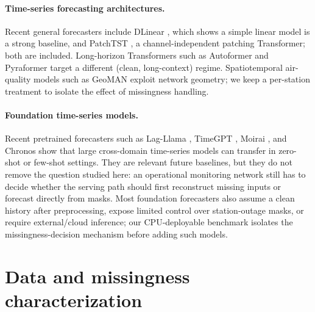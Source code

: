 \documentclass[review,3p,times]{elsarticle}
\begin{document}
\paragraph{Time-series forecasting architectures.}
Recent general forecasters include DLinear \citep{zeng2023dlinear}, which shows a
simple linear model is a strong baseline, and PatchTST \citep{nie2023patchtst},
a channel-independent patching Transformer; both are included. Long-horizon
Transformers such as Autoformer \citep{wu2021autoformer} and Pyraformer
\citep{liu2022pyraformer} target a different (clean, long-context) regime.
Spatiotemporal air-quality models such as GeoMAN \citep{liang2018geoman} exploit
network geometry; we keep a per-station treatment to isolate the effect of
missingness handling.

\paragraph{Foundation time-series models.}
Recent pretrained forecasters such as Lag-Llama \citep{rasul2023lagllama},
TimeGPT \citep{garza2023timegpt}, Moirai \citep{woo2024moirai}, and Chronos
\citep{ansari2024chronos} show that large cross-domain time-series models can
transfer in zero-shot or few-shot settings. They are relevant future baselines,
but they do not remove the question studied here: an operational monitoring
network still has to decide whether the serving path should first reconstruct
missing inputs or forecast directly from masks. Most foundation forecasters also
assume a clean history after preprocessing, expose limited control over
station-outage masks, or require external/cloud inference; our CPU-deployable
benchmark isolates the missingness-decision mechanism before adding such models.

\section{Data and missingness characterization}
\label{sec:data}
\end{document}
